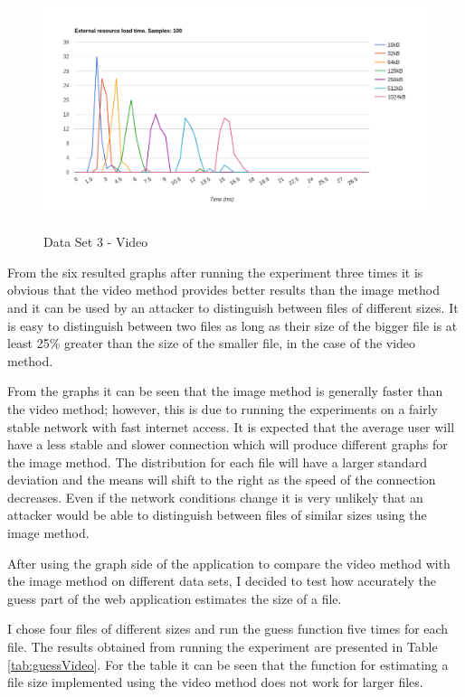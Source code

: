 \documentclass[10pt,a4paper,twoside]{book}
\begin{document}
\begin{figure}[h]
\centering
\includegraphics[width=\textwidth, height=7cm]{figures/v100E.png}
\caption{Data Set 3 - Video}
\label{fig:eI}
\end{figure}

From the six resulted graphs after running the experiment three times it is obvious that the video method provides better results than the image method and it can be used by an attacker to distinguish between files of different sizes. It is easy to distinguish between two files as long as their size of the bigger file is at least 25\% greater than the size of the smaller file, in the case of the video method. 

From the graphs it can be seen that the image method is generally faster than the video method; however, this is due to running the experiments on a fairly stable network with fast internet access. It is expected that the average user will have a less stable and slower connection which will produce different graphs for the image method. The distribution for each file will have a larger standard deviation and the means will shift to the right as the speed of the connection decreases. Even if the network conditions change it is very unlikely that an attacker would be able to distinguish between files of similar sizes using the image method.

After using the graph side of the application to compare the video method with the image method on different data sets, I decided to test how accurately the guess part of the web application estimates the size of a file. 

I chose four files of different sizes and run the guess function five times for each file. The results obtained from running the experiment are presented in Table \ref{tab:guessVideo}. For the table it can be seen that the function for estimating a file size implemented using the video method does not work for larger files. 
\end{document}
